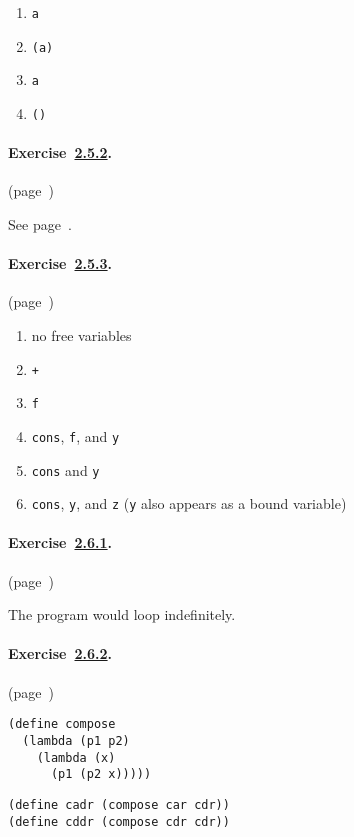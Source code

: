  \begin{enumerate}[\it a. ]
\item \texttt{a} \item \texttt{(a)} \item \texttt{a} \item \texttt{()} \end{enumerate}
 


\paragraph{Exercise \hyperref[start_g23]{2.5.2}. }(page \pageref{start_s73})

  See page \pageref{start_defn_list}. 


\paragraph{Exercise \hyperref[start_g24]{2.5.3}. }(page \pageref{start_s74})

   
 
 \begin{enumerate}[\it a. ]
\item no free variables \item \texttt{+} \item \texttt{f} \item \texttt{cons}, \texttt{f}, and \texttt{y} \item \texttt{cons} and \texttt{y} \item \texttt{cons}, \texttt{y}, and \texttt{z} (\texttt{y} also       appears as a bound variable) \end{enumerate}
 


\paragraph{Exercise \hyperref[start_g26]{2.6.1}. }(page \pageref{start_s91})

  The program would loop indefinitely. 


\paragraph{Exercise \hyperref[start_g27]{2.6.2}. }(page \pageref{start_s92})

  
\begin{alltt}
 (define compose
   (lambda (p1 p2)
     (lambda (x)
       (p1 (p2 x))))) 

(define cadr (compose car cdr))
 (define cddr (compose cdr cdr))
\end{alltt}



